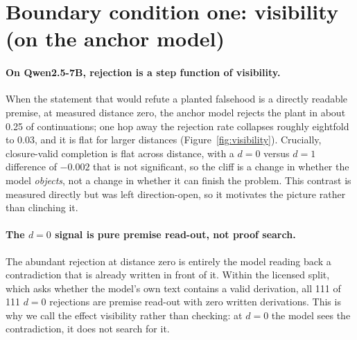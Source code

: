 \section{Boundary condition one: visibility (on the anchor model)}
\label{sec:visibility}


\paragraph{On Qwen2.5-7B, rejection is a step function of visibility.} When
the statement that would refute a planted falsehood is a directly readable
premise, at measured distance zero, the anchor model rejects the plant in
about 0.25 of continuations; one hop away the rejection rate collapses
roughly eightfold to 0.03, and it is flat for larger distances
(Figure~\ref{fig:visibility}).
Crucially, closure-valid completion is flat across distance, with a $d{=}0$
versus $d{=}1$ difference of $-0.002$ that is not significant, so the cliff
is a change in whether the model \emph{objects}, not a change in whether it
can finish the problem.
This contrast is measured directly but was left direction-open, so it
motivates the picture rather than clinching it.

\paragraph{The $d{=}0$ signal is pure premise read-out, not proof search.}
The abundant rejection at distance zero is entirely the model reading back a
contradiction that is already written in front of it. Within the licensed
split, which asks whether the model's own text contains a valid derivation,
all 111 of 111 $d{=}0$ rejections are premise read-out with zero written
derivations.
This is why we call the effect visibility rather than checking: at $d{=}0$
the model sees the contradiction, it does not search for it.

